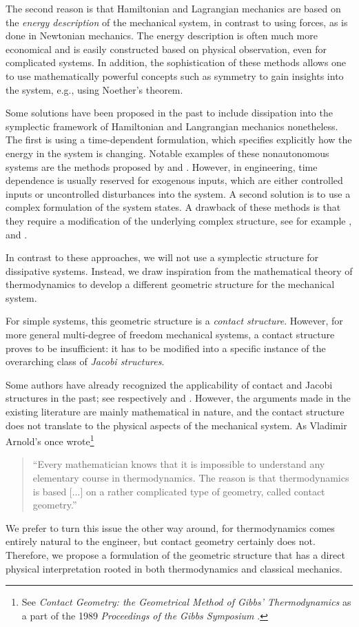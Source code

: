 The second reason is that Hamiltonian and Lagrangian mechanics are based on the \emph{energy description} of the mechanical system, in contrast to using forces, as is done in Newtonian mechanics. The energy description is often much more economical and is easily constructed based on physical observation, even for complicated systems. In addition, the sophistication of these methods allows one to use mathematically powerful concepts such as symmetry to gain insights into the system, e.g., using Noether's theorem.

Some solutions have been proposed in the past to include dissipation into the symplectic framework of Hamiltonian and Langrangian mechanics nonetheless. The first is using a time-dependent formulation, which specifies explicitly how the energy in the system is changing. Notable examples of these nonautonomous systems are the methods proposed by \citet{Caldirola1941} and \citet{Kanai1948}. However, in engineering, time dependence is usually reserved for exogenous inputs, which are either controlled inputs or uncontrolled disturbances into the system. A second solution is to use a complex formulation of the system states. A drawback of these methods is that they require a modification of the underlying complex structure, see for example \citet{Hutters2020}, \citet{Dedene1980} and \citet{Rajeev2007}.

In contrast to these approaches, we will not use a symplectic structure for dissipative systems. Instead, we draw inspiration from the mathematical theory of thermodynamics to develop a different geometric structure for the mechanical system.

For simple systems, this geometric structure is a \emph{contact structure}. However, for more general multi-degree of freedom mechanical systems, a contact structure proves to be insufficient: it has to be modified into a specific instance of the overarching class of \emph{Jacobi structures}. 

Some authors have already recognized the applicability of contact and Jacobi structures in the past; see respectively \citet{Bravetti2017} and \citet{ciaglia2018}. However, the arguments made in the existing literature are mainly mathematical in nature, and the contact structure does not translate to the physical aspects of the mechanical system. As Vladimir Arnold's once wrote\footnote{See \emph{Contact Geometry: the Geometrical Method of Gibbs' Thermodynamics} as a part of the 1989 \emph{Proceedings of the Gibbs Symposium} \cite[p. 163]{Arnold1989b}.}
\begin{quote}
``Every mathematician knows that it is impossible to understand any elementary course in thermodynamics. The reason is that thermodynamics is based [...] on a rather complicated type of geometry, called contact geometry.''
\end{quote}
We prefer to turn this issue the other way around, for thermodynamics comes entirely natural to the engineer, but contact geometry certainly does not. Therefore, we propose a formulation of the geometric structure that has a direct physical interpretation rooted in both thermodynamics and classical mechanics.

